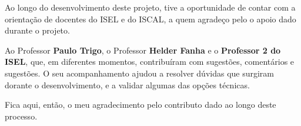 




Ao longo do desenvolvimento deste projeto, tive a oportunidade de contar com a orientação de docentes do ISEL e do ISCAL, a quem agradeço pelo o apoio dado durante o projeto. 

Ao Professor \textbf{Paulo Trigo}, o Professor \textbf{Helder Fanha} e o \textbf{Professor 2 do ISEL}, que, em diferentes momentos, contribuíram com sugestões, comentários e sugestões. O seu acompanhamento ajudou a resolver dúvidas que surgiram dorante o desenvolvimento, e a validar algumas das opções técnicas.

Fica aqui, então, o meu agradecimento pelo contributo dado ao longo deste processo.
